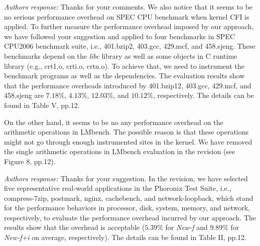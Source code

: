 \documentclass[oneside, 11pt]{article}
\begin{document}
\smallskip
\smallskip
\smallskip
{}

{\em Authors response:}
Thanks for your comments. We also notice that it seems to be no
serious performance overhead on SPEC CPU benchmark when kernel CFI is
applied. To further measure the performance overhead imposed by our approach,
we have followed your suggestion and applied \TheName{} to four benchmarks
in SPEC CPU2006 benchmark suite, i.e., 401.bzip2, 403.gcc, 429.mcf, and 458.sjeng.
These benchmarks depend on the \emph{libc} library as well as some objects
in C runtime library (e.g., crt1.o, crti.o, crtn.o). To achieve that,
we need to instrument the benchmark programs as well as the dependencies.
The evaluation results show that the performance overheads introduced by
401.bzip12, 403.gcc, 429.mcf, and 458.sjeng are $7.18$\%, $4.13$\%, $12.03$\%, and
$10.12$\%, respectively. The details can be found in Table V, pp.12.

On the other hand, it seems to be no any performance overhead on the arithmetic
operations in LMbench. The possible reason is that these operations might not
go through enough instrumented sites in the kernel. We have removed the
single arithmetic operations in LMbench evaluation in the revision (see Figure 8, pp.12).


\smallskip
\smallskip
\smallskip
{}

{\em Authors response:}
Thanks for your suggestion. In the revision, we have selected five
representative real-world applications in the Phoronix Test Suite,
i.e., compress-7zip, postmark, nginx, cachebench, and network-loopback,
which stand for the performance behaviors in processor, disk, system, memory, and
network, respectively, to evaluate the performance overhead incurred by our
approach. The results show that the overhead is acceptable ($5.39$\% for \emph{New-f} and
$9.89$\% for \emph{New-f+i} on average, respectively). The details
can be found in Table II, pp.12.
\end{document}
